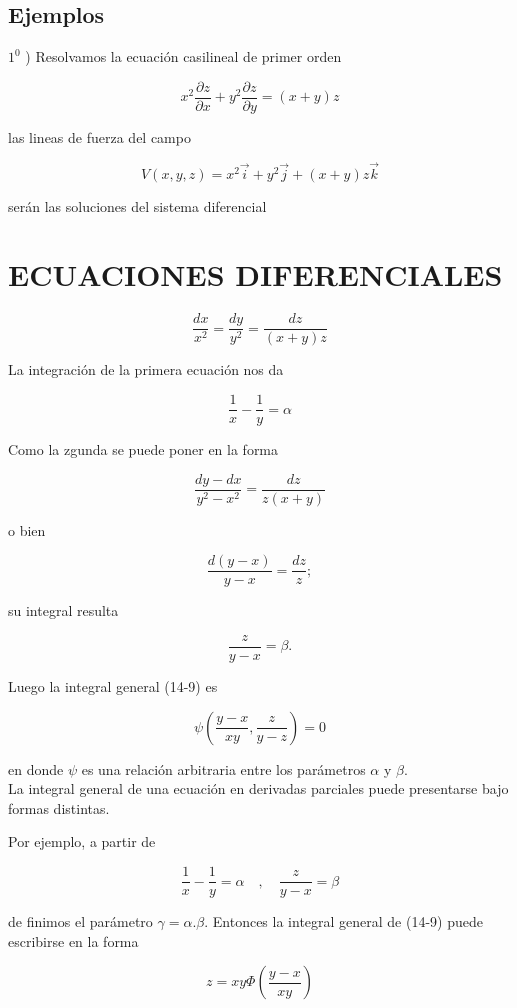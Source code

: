 \documentclass[10pt]{article}
\theoremstyle{plain}
\theoremstyle{definition}
\theoremstyle{remark}
\begin{document}
\subsection{Ejemplos}
$1^{0}$ ) Resolvamos la ecuación casilineal de primer orden


\begin{equation*}
x^{2} \frac{\partial z}{\partial x}+y^{2} \frac{\partial z}{\partial y}=(x+y) z \tag{14-9}
\end{equation*}


las lineas de fuerza del campo

$$
V(x, y, z)=x^{2} \vec{i}+y^{2} \vec{j}+(x+y) z \vec{k}
$$

serán las soluciones del sistema diferencial

\section*{ECUACIONES DIFERENCIALES}
$$
\frac{d x}{x^{2}}=\frac{d y}{y^{2}}=\frac{d z}{(x+y) z}
$$

La integración de la primera ecuación nos da

$$
\frac{1}{x}-\frac{1}{y}=\alpha
$$

Como la zgunda se puede poner en la forma

$$
\frac{d y-d x}{y^{2}-x^{2}}=\frac{d z}{z(x+y)}
$$

o bien

$$
\frac{d(y-x)}{y-x}=\frac{d z}{z} ;
$$

su integral resulta

$$
\frac{z}{y-x}=\beta .
$$

Luego la integral general (14-9) es


\begin{equation*}
\psi\left(\frac{y-x}{x y}, \frac{z}{y-z}\right)=0 \tag{14-10}
\end{equation*}


en donde $\psi$ es una relación arbitraria entre los parámetros $\alpha$ y $\beta$.\\
La integral general de una ecuación en derivadas parciales puede presentarse bajo formas distintas.

Por ejemplo, a partir de


$$
\frac{1}{x}-\frac{1}{y}=\alpha \quad, \quad \frac{z}{y-x}=\beta
$$

de finimos el parámetro $\gamma=\alpha . \beta$. Entonces la integral general de (14-9) puede escribirse en la forma

$$
z=x y \Phi\left(\frac{y-x}{x y}\right)
$$
\end{document}
